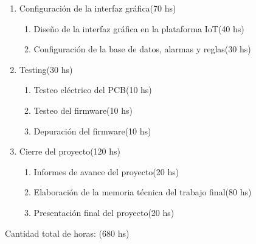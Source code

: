 \documentclass[
11pt, %
codirector, %
]{charter}
\begin{document}
\begin{enumerate}
\item Configuración de la interfaz gráfica(70 hs)
    \begin{enumerate}
		\item Diseño de la interfaz gráfica en la plataforma IoT(40 hs)
		\item Configuración de la base de datos, alarmas y reglas(30 hs)
	\end{enumerate}
\item Testing(30 hs)	
    \begin{enumerate}
		\item Testeo eléctrico del PCB(10 hs)
		\item Testeo del firmware(10 hs)
		\item Depuración del firmware(10 hs)
	\end{enumerate}
\item Cierre del proyecto(120 hs)	
    \begin{enumerate}
		\item Informes de avance del proyecto(20 hs)
		\item Elaboración de la memoria técnica del trabajo final(80 hs)
		\item Presentación final del proyecto(20 hs)
	\end{enumerate}


\end{enumerate}

Cantidad total de horas: (680 hs)
\end{document}
